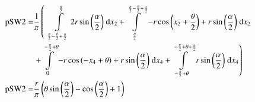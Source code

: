 \begin{align}
    \mathrm{pSW2} =&\frac{1}{\pi} \left(\;\;\int\limits_{\frac{\pi}{2} - \frac{\theta}{2} + \frac{\alpha}{2}}^{\frac{\pi}{2}}2 r \sin{\left (\frac{\alpha}{2} \right )}\;\mathrm{d}x_{2}+\int\limits_{\frac{\theta}{2}}^{\frac{\pi}{2} - \frac{\theta}{2} + \frac{\alpha}{2}}- r \cos{\left (x_{2} + \frac{\theta}{2} \right )} + r \sin{\left (\frac{\alpha}{2} \right )}\;\mathrm{d}x_{2}\right.\notag\\
 &\left.+\int\limits_{0}^{- \frac{\pi}{2} + \theta}- r \cos{\left (- x_{4} + \theta \right )} + r \sin{\left (\frac{\alpha}{2} \right )}\;\mathrm{d}x_{4}+\int\limits_{- \frac{\pi}{2} + \theta}^{- \frac{\pi}{2} + \theta + \frac{\alpha}{2}}r \sin{\left (\frac{\alpha}{2} \right )}\;\mathrm{d}x_{4}\right)\label{pSW2Def}\\
    \mathrm{pSW2} =& \frac{r}{\pi} \left(\theta \sin{\left (\frac{\alpha}{2} \right )} - \cos{\left (\frac{\alpha}{2} \right )} + 1\right)\label{pSW2Sln}
\end{align}